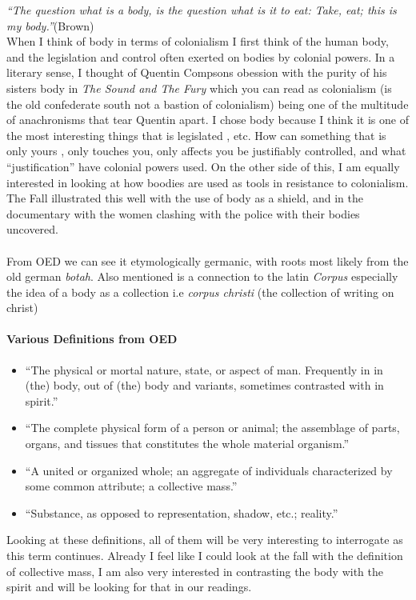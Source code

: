 \textit{``The question what is a body, is the question what is it to eat: Take, eat; this is my body.''}(Brown) \\


When I think of body in terms of colonialism I first think of the human body, and the legislation and control often exerted on bodies by colonial powers. In a literary sense, I thought of Quentin Compsons obession with the purity of his sisters body in \textit{The Sound and The Fury} which you can read as colonialism (is the old confederate south not a bastion of colonialism) being one of the multitude of anachronisms that tear Quentin apart. I chose body because I think it is one of the most interesting things that is legislated , etc. How can something that is only yours , only touches you, only affects you be justifiably controlled, and what ``justification'' have colonial powers used. 
On the other side of this, I am equally interested in looking at how boodies are used as tools in resistance to colonialism. The Fall illustrated this well with the use of body as a shield, and in the documentary with the women clashing with the police with their bodies uncovered.

\paragraph{}
From OED we can see it etymologically germanic, with roots most likely from the old german \textit{botah}. Also mentioned is a connection to the latin \textit{Corpus} especially the idea of a body as a collection i.e \textit{corpus christi} (the collection of writing on christ)
\paragraph{Various Definitions from OED}
\begin{itemize}
\item ``The physical or mortal nature, state, or aspect of man. Frequently in in (the) body, out of (the) body and variants, sometimes contrasted with in spirit.''

\item``The complete physical form of a person or animal; the assemblage of parts, organs, and tissues that constitutes the whole material organism.''

\item``A united or organized whole; an aggregate of individuals characterized by some common attribute; a collective mass.''

\item``Substance, as opposed to representation, shadow, etc.; reality.''

\end{itemize}
Looking at these definitions, all of them will be very interesting to interrogate as this term continues. Already I feel like I could look at the fall with the definition of collective mass, I am also very interested in contrasting the body with the spirit and will be looking for that in our readings.
